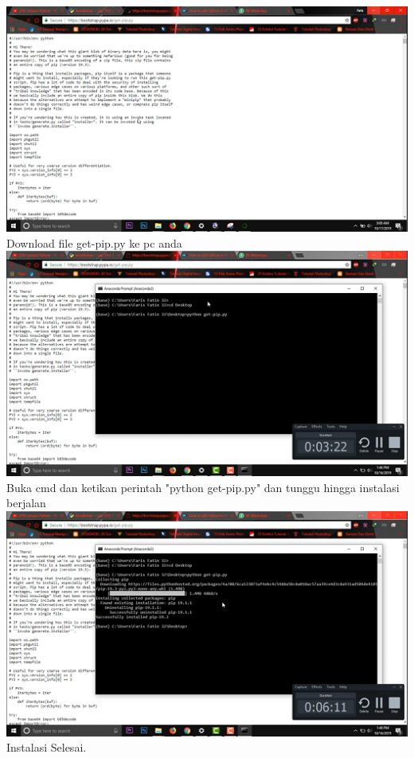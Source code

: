 \begin{enumerate}
\includegraphics{gambar/2_3.png}
Download file get-pip.py ke pc anda\\

\includegraphics{gambar/2_4.png}
Buka cmd dan ketikan perintah "python get-pip.py" dan tunggu hingga instalasi berjalan\\

\includegraphics{gambar/2_5.png}
Instalasi Selesai.\\


\end{enumerate}
